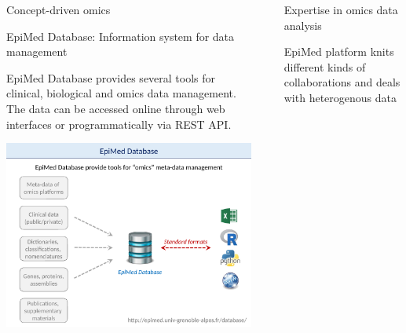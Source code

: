 \documentclass[final]{beamer}
\newlength{\sepwid}
\newlength{\twocolwid}
\begin{document}
\begin{frame}[t]
\begin{columns}[t]
\begin{column}{\twocolwid}
\begin{block}{Concept-driven omics}
\end{block}


\begin{block}{EpiMed Database: Information system for data management}

EpiMed Database provides several tools for clinical, biological and omics data management. The data can be accessed online through web interfaces or programmatically via REST API.

{
\centering
\mbox{\includegraphics[trim = 0mm 0mm 0mm 30mm, clip, width=\linewidth]{figs/fig03}}

}


\end{block}

\end{column} 

\begin{column}{\sepwid}\end{column} %

\begin{column}{\twocolwid} %




\begin{block}{Expertise in omics data analysis}


EpiMed platform knits different kinds of collaborations
and deals with heterogenous data


\end{block}
\end{column}
\end{columns}
\end{frame}
\end{document}
